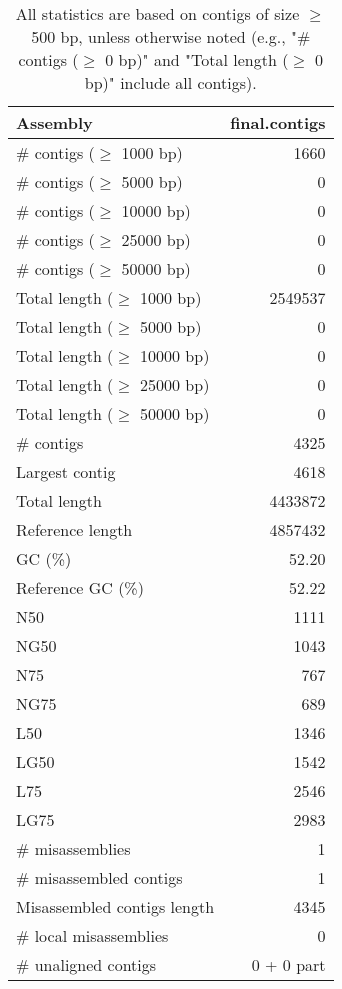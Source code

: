 \documentclass[12pt,a4paper]{article}
\begin{document}
\begin{table}[ht]
\begin{center}
\caption{All statistics are based on contigs of size $\geq$ 500 bp, unless otherwise noted (e.g., "\# contigs ($\geq$ 0 bp)" and "Total length ($\geq$ 0 bp)" include all contigs).}
\begin{tabular}{|l*{1}{|r}|}
\hline
Assembly & final.contigs \\ \hline
\# contigs ($\geq$ 1000 bp) & 1660 \\ \hline
\# contigs ($\geq$ 5000 bp) & 0 \\ \hline
\# contigs ($\geq$ 10000 bp) & 0 \\ \hline
\# contigs ($\geq$ 25000 bp) & 0 \\ \hline
\# contigs ($\geq$ 50000 bp) & 0 \\ \hline
Total length ($\geq$ 1000 bp) & 2549537 \\ \hline
Total length ($\geq$ 5000 bp) & 0 \\ \hline
Total length ($\geq$ 10000 bp) & 0 \\ \hline
Total length ($\geq$ 25000 bp) & 0 \\ \hline
Total length ($\geq$ 50000 bp) & 0 \\ \hline
\# contigs & 4325 \\ \hline
Largest contig & 4618 \\ \hline
Total length & 4433872 \\ \hline
Reference length & 4857432 \\ \hline
GC (\%) & 52.20 \\ \hline
Reference GC (\%) & 52.22 \\ \hline
N50 & 1111 \\ \hline
NG50 & 1043 \\ \hline
N75 & 767 \\ \hline
NG75 & 689 \\ \hline
L50 & 1346 \\ \hline
LG50 & 1542 \\ \hline
L75 & 2546 \\ \hline
LG75 & 2983 \\ \hline
\# misassemblies & 1 \\ \hline
\# misassembled contigs & 1 \\ \hline
Misassembled contigs length & 4345 \\ \hline
\# local misassemblies & 0 \\ \hline
\# unaligned contigs & 0 + 0 part \\ \hline

\end{tabular}
\end{center}
\end{table}
\end{document}
